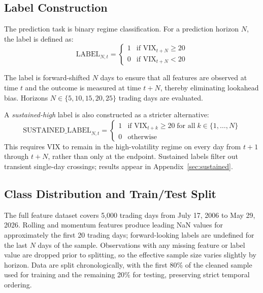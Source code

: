 \documentclass[11pt]{article}
\begin{document}
\subsection{Label Construction}

The prediction task is binary regime classification. For a prediction horizon $N$, the label is defined as:
\begin{equation}
    \text{LABEL}_{N,t} = \begin{cases} 1 & \text{if } \text{VIX}_{t+N} \geq 20 \\ 0 & \text{if } \text{VIX}_{t+N} < 20 \end{cases}
    \label{eq:label}
\end{equation}

The label is forward-shifted $N$ days to ensure that all features are observed at time $t$ and the outcome is measured at time $t + N$, thereby eliminating lookahead bias. Horizons $N \in \{5, 10, 15, 20, 25\}$ trading days are evaluated.

A \emph{sustained-high} label is also constructed as a stricter alternative:
\begin{equation}
    \text{SUSTAINED\_LABEL}_{N,t} = \begin{cases} 1 & \text{if } \text{VIX}_{t+k} \geq 20 \;\text{for all}\; k \in \{1, \ldots, N\} \\ 0 & \text{otherwise} \end{cases}
    \label{eq:sustained}
\end{equation}
This requires VIX to remain in the high-volatility regime on every day from $t+1$ through $t+N$, rather than only at the endpoint. Sustained labels filter out transient single-day crossings; results appear in Appendix~\ref{sec:sustained}.

\subsection{Class Distribution and Train/Test Split}

The full feature dataset covers 5,000 trading days from July 17, 2006 to May 29, 2026. Rolling and momentum features produce leading NaN values for approximately the first 20 trading days; forward-looking labels are undefined for the last $N$ days of the sample. Observations with any missing feature or label value are dropped prior to splitting, so the effective sample size varies slightly by horizon. Data are split chronologically, with the first 80\% of the cleaned sample used for training and the remaining 20\% for testing, preserving strict temporal ordering.
\end{document}
